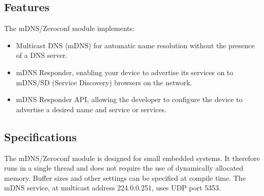 \documentclass[11pt,titlepage]{article}
\begin{document}
\subsection{Features}

The mDNS/Zeroconf module implements:

\begin{itemize}
	\item Multicast DNS (mDNS) for automatic name resolution without the
		  presence of a DNS server.
	\item mDNS Responder, enabling your device to advertise its services on
		  to mDNS/SD (Service Discovery) browsers on the network.
	\item mDNS Responder API, allowing the developer to configure the device
		  to advertise a desired name and service or services.
\end{itemize}

\subsection{Specifications}

The mDNS/Zeroconf module is designed for small embedded systems.  It therefore
runs in a single thread and does not require the use of dynamically allocated 
memory.  Buffer sizes and other settings can be specified at compile time. The 
mDNS service, at multicast address 224.0.0.251, uses UDP port 5353.
\end{document}
